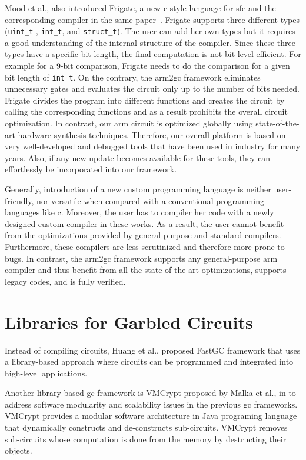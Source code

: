 Mood et al., also introduced Frigate, a new \gls{c}-style language for \acrshort{sfe} and the corresponding compiler in the same paper~\cite{mood2016frigate}.
Frigate supports three different types (\texttt{uint\_t} , \texttt{int\_t}, and \texttt{struct\_t}).
The user can add her own types but it requires a good understanding of the internal structure of the compiler.
Since these three types have a specific bit length, the final computation is not bit-level efficient.
For example for a 9-bit comparison, Frigate needs to do the comparison for a given bit length of \texttt{int\_t}.
On the contrary, the \gls{arm2gc} framework eliminates unnecessary gates and evaluates the circuit only up to the number of bits needed.
Frigate divides the program into different functions and creates the circuit by calling the corresponding functions and as a result prohibits the overall circuit optimization.
In contrast, our \gls{arm} circuit is optimized globally using state-of-the-art hardware synthesis techniques.
Therefore, our overall platform is based on very well-developed and debugged tools that have been used in industry for many years.
Also, if any new update becomes available for these tools, they can effortlessly be incorporated into our framework.

Generally, introduction of a new custom programming language is neither user-friendly, nor versatile when compared with a conventional programming languages like \gls{c}.
Moreover, the user has to compiler her code with a newly designed custom compiler in these works.
As a result, the user cannot benefit from the optimizations provided by general-purpose and standard compilers.
Furthermore, these compilers are less scrutinized and therefore more prone to bugs.
In contrast, the \gls{arm2gc} framework supports any general-purpose \gls{arm} compiler and thus benefit from all the state-of-the-art optimizations, supports legacy codes, and is fully verified.

\section{Libraries for Garbled Circuits}\label{sec:related-library}
Instead of compiling circuits, Huang et al., \cite{huang2011faster} proposed  FastGC framework that uses a library-based approach where circuits can be programmed and integrated into high-level applications.

Another library-based \acrshort{gc} framework is VMCrypt proposed by Malka et al., in \cite{malka2011vmcrypt} to address software modularity and scalability issues in the previous \acrshort{gc} frameworks.
VMCrypt provides a modular software architecture in Java programing language that dynamically constructs and de-constructs sub-circuits.
VMCrypt removes sub-circuits whose computation is done from the memory by destructing their objects.

